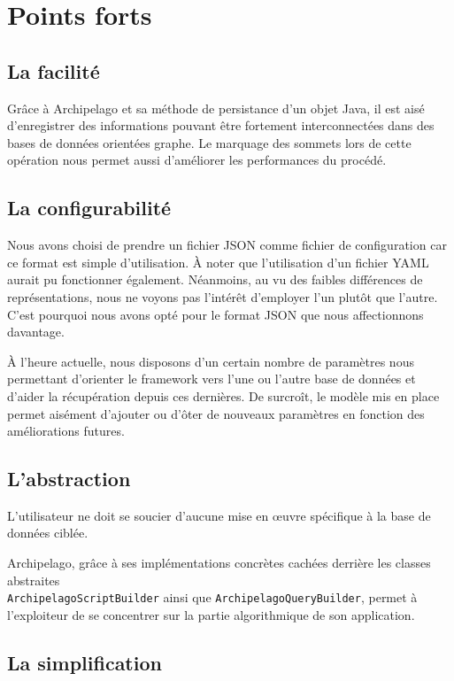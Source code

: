 \documentclass[a4paper,fleqn,12pt,oneside]{book}
\begin{document}
\section{Points forts}

\subsection{La facilité}

Grâce à Archipelago et sa méthode de persistance d'un objet Java, il est aisé d'enregistrer des informations pouvant être fortement interconnectées dans des bases de données orientées graphe. 
Le marquage des sommets lors de cette opération nous permet aussi d'améliorer les performances du procédé. 

\subsection{La configurabilité}

Nous avons choisi de prendre un fichier JSON comme fichier de configuration car ce format est simple d'utilisation. À noter que l'utilisation d'un fichier YAML aurait pu fonctionner également. Néanmoins, au vu des faibles différences de représentations, nous ne voyons pas l'intérêt d'employer l'un plutôt que l'autre. C'est pourquoi nous avons opté pour le format JSON que nous affectionnons davantage. 

\`A l'heure actuelle, nous disposons d'un certain nombre de paramètres nous permettant d'orienter le framework vers l'une ou l'autre base de données et d'aider la récupération depuis ces dernières. De surcroît, le modèle mis en place permet aisément d'ajouter ou d'ôter de nouveaux paramètres en fonction des améliorations futures. 
\newpage
\subsection{L'abstraction}

L'utilisateur ne doit se soucier d'aucune mise en œuvre spécifique à la base de données ciblée. 

Archipelago, grâce à ses implémentations concrètes cachées derrière les classes abstraites \\\texttt{ArchipelagoScriptBuilder} ainsi que \texttt{ArchipelagoQueryBuilder}, permet à l'exploiteur de se concentrer sur la partie algorithmique de son application.

\subsection{La simplification}
\end{document}
